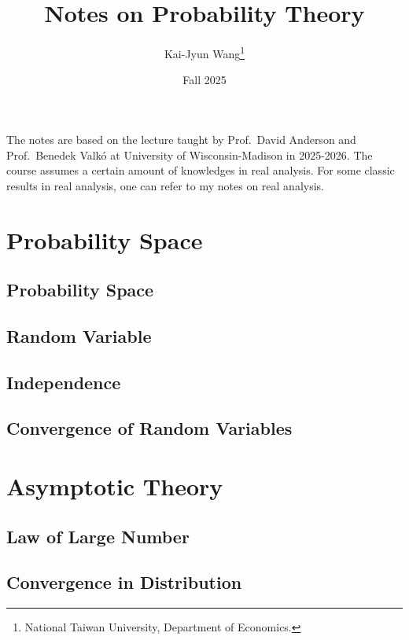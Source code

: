 \documentclass[a4paper, 12pt]{article}
\title{Notes on Probability Theory}
\author{Kai-Jyun Wang\thanks{National Taiwan University, Department of Economics.}}
\date{Fall 2025}
\begin{document}
 
\maketitle

The notes are based on the lecture taught by Prof.\ David Anderson and Prof.\ Benedek Valkó 
at University of Wisconsin-Madison in 2025-2026. The course assumes a certain amount of 
knowledges in real analysis. For some classic results in real analysis, one can refer to my 
notes on real analysis.  

\newpage 
\tableofcontents
\newpage

\section{Probability Space}
\subsection{Probability Space}

\newpage

\subsection{Random Variable}

\newpage

\subsection{Independence}

\newpage

\subsection{Convergence of Random Variables}

\newpage

\section{Asymptotic Theory}

\subsection{Law of Large Number}

\newpage

\subsection{Convergence in Distribution}

\newpage
\end{document}
